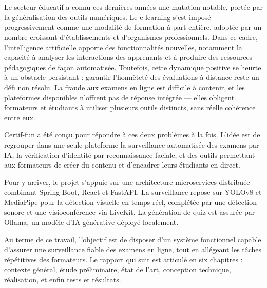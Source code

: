 \chapter*{}

Le secteur éducatif a connu ces dernières années une mutation notable, portée par la généralisation des outils numériques. Le e-learning s'est imposé progressivement comme une modalité de formation à part entière, adoptée par un nombre croissant d'établissements et d'organismes professionnels. Dans ce cadre, l'intelligence artificielle apporte des fonctionnalités nouvelles, notamment la capacité à analyser les interactions des apprenants et à produire des ressources pédagogiques de façon automatisée. Toutefois, cette dynamique positive se heurte à un obstacle persistant : garantir l'honnêteté des évaluations à distance reste un défi non résolu. La fraude aux examens en ligne est difficile à contenir, et les plateformes disponibles n'offrent pas de réponse intégrée --- elles obligent formateurs et étudiants à utiliser plusieurs outils distincts, sans réelle cohérence entre eux.

Certif-fun a été conçu pour répondre à ces deux problèmes à la fois. L'idée est de regrouper dans une seule plateforme la surveillance automatisée des examens par IA, la vérification d'identité par reconnaissance faciale, et des outils permettant aux formateurs de créer du contenu et d'encadrer leurs étudiants en direct.

Pour y arriver, le projet s'appuie sur une architecture microservices distribuée combinant Spring Boot, React et FastAPI. La surveillance repose sur YOLOv8 et MediaPipe pour la détection visuelle en temps réel, complétée par une détection sonore et une visioconférence via LiveKit. La génération de quiz est assurée par Ollama, un modèle d'IA générative déployé localement.

Au terme de ce travail, l'objectif est de disposer d'un système fonctionnel capable d'assurer une surveillance fiable des examens en ligne, tout en allégeant les tâches répétitives des formateurs. Le rapport qui suit est articulé en six chapitres : contexte général, étude préliminaire, état de l'art, conception technique, réalisation, et enfin tests et résultats.
